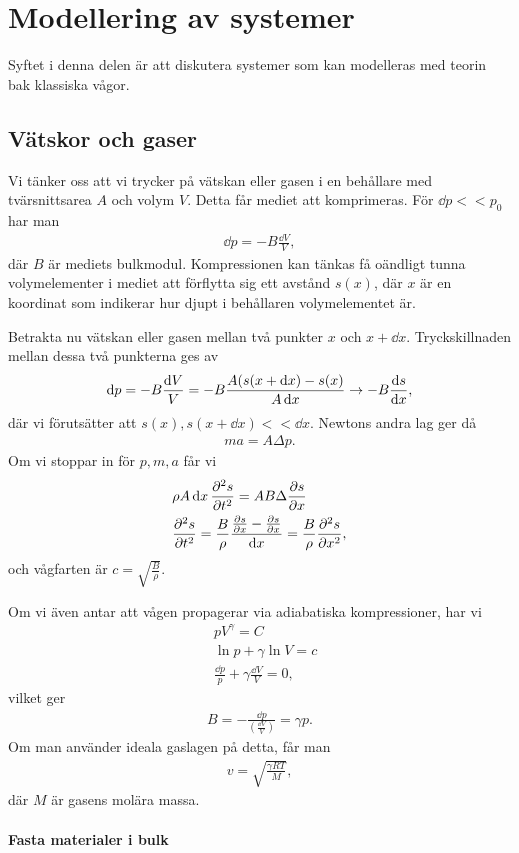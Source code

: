 \section{Modellering av systemer}
Syftet i denna delen är att diskutera systemer som kan modelleras med teorin bak klassiska vågor.

\subsection{Vätskor och gaser}
Vi tänker oss att vi trycker på vätskan eller gasen i en behållare med tvärsnittsarea $A$ och volym $V$. Detta får mediet att komprimeras. För $\dd{p} << p_0$ har man
\begin{align*}
	\dd{p} = -B\frac{\dd{V}}{V},
\end{align*}
där $B$ är mediets bulkmodul. Kompressionen kan tänkas få oändligt tunna volymelementer i mediet att förflytta sig ett avstånd $s(x)$, där $x$ är en koordinat som indikerar hur djupt i behållaren volymelementet är.

Betrakta nu vätskan eller gasen mellan två punkter $x$ och $x + \dd{x}$. Tryckskillnaden mellan dessa två punkterna ges av
\begin{align*}
	\dd{p} = -B\frac{\dd{V}}{V} = -B\frac{A(s(x + \dd{x}) - s(x)}{A\dd{x}}\to -B\dv{s}{x},
\end{align*}
där vi förutsätter att $s(x), s(x + \dd{x}) << \dd{x}$. Newtons andra lag ger då
\begin{align*}
	ma = A\Delta p. 
\end{align*}
Om vi stoppar in för $p, m, a$ får vi
\begin{align*}
	&\rho A\dd{x}\pdv[2]{s}{t} = AB\Delta\pdv{s}{x} \\
	&\pdv[2]{s}{t} = \frac{B}{\rho}\frac{\pdv{s}{x}(x + \dd{x}) - \pdv{s}{x}(x)}{\dd{x}} = \frac{B}{\rho}\pdv[2]{s}{x},
\end{align*}
och vågfarten är $c = \sqrt{\frac{B}{\rho}}$.

Om vi även antar att vågen propagerar via adiabatiska kompressioner, har vi
\begin{align*}
	&pV^{\gamma} = C \\
	&\ln{p} + \gamma\ln{V} = c \\
	&\frac{\dd{p}}{p} + \gamma\frac{\dd{V}}{V} = 0,
\end{align*}
vilket ger
\begin{align*}
	B = -\frac{\dd{p}}{\left(\frac{\dd{V}}{V}\right)} = \gamma p.
\end{align*}
Om man använder ideala gaslagen på detta, får man
\begin{align*}
	v = \sqrt{\frac{\gamma RT}{M}},
\end{align*}
där $M$ är gasens molära massa.

\paragraph{Fasta materialer i bulk}